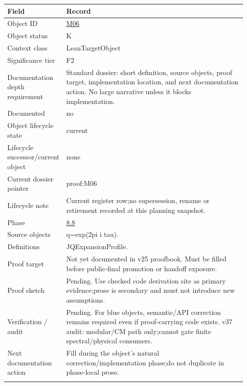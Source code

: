 \begin{longtable}{L{0.16\linewidth} L{0.81\linewidth}}
\hline
\textbf{Field} & \textbf{Record}\\
\hline
Object ID & \hyperlink{object-row-M06}{M06}\\
\hline\addlinespace[0.20em]
Object status & K\\
\hline\addlinespace[0.20em]
Context class & LeanTargetObject\\
\hline\addlinespace[0.20em]
Significance tier & F2\\
\hline\addlinespace[0.20em]
Documentation depth requirement & Standard dossier: short definition, source objects, proof target, implementation location, and next documentation action. No large narrative unless it blocks implementation.\\
\hline\addlinespace[0.20em]
Documented & no\\
\hline\addlinespace[0.20em]
Object lifecycle state & current\\
\hline\addlinespace[0.20em]
Lifecycle successor/\allowbreak{}current object & none\\
\hline\addlinespace[0.20em]
Current dossier pointer & proof:M06\\
\hline\addlinespace[0.20em]
Lifecycle note & Current register row;\newline no supersession, rename or retirement recorded at this planning snapshot.\\
\hline\addlinespace[0.20em]
Phase & \hyperlink{phase-row-8-8}{8.8}\\
\hline\addlinespace[0.20em]
Source objects & q=exp(2pi i tau).\\
\hline\addlinespace[0.20em]
Definitions & JQExpansionProfile.\\
\hline\addlinespace[0.20em]
Proof target & Not yet documented in v25 proofbook. Must be filled before public-final promotion or handoff exposure.\\
\hline\addlinespace[0.20em]
Proof sketch & Pending. Use checked code derivation site as primary evidence;\newline prose is secondary and must not introduce new assumptions.\\
\hline\addlinespace[0.20em]
Verification /\allowbreak{} audit & Pending. For blue objects, semantic/\allowbreak{}API correction remains required even if proof-carrying code exists. v37 audit: modular/\allowbreak{}CM path only;\newline cannot gate finite spectral/\allowbreak{}physical consumers.\\
\hline\addlinespace[0.20em]
Next documentation action & Fill during the object's natural correction/\allowbreak{}implementation phase;\newline do not duplicate in phase-local prose.\\
\hline\addlinespace[0.20em]
\end{longtable}
